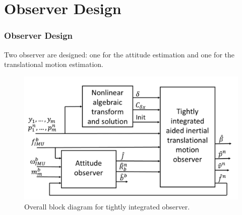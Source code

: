 \documentclass{beamer}
\begin{document}
\section{Observer Design}
	\begin{frame}
	\frametitle{Observer Design}
	Two observer are designed: one for the attitude estimation and one for the translational motion estimation. 
		\begin{figure}[H]
		\centering
		\includegraphics[scale=0.3]{observers}
		\caption{Overall block diagram for tightly integrated observer.}
	\end{figure}
	\end{frame}
\end{document}
